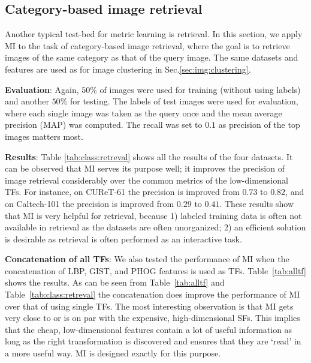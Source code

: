 \documentclass[10pt,twocolumn,letterpaper]{article}
\begin{document}

\subsection{Category-based image retrieval}

Another typical test-bed for metric learning is retrieval. In this
section, we apply MI to the task of category-based image retrieval,
where the goal is to retrieve images of the same category as that 
of the query image. The same datasets and features are used as for
image clustering in Sec.\ref{sec:img:clustering}.

\textbf{Evaluation}: Again, $50\%$ of images were used for training
(without using labels) and another $50\%$ for testing. The labels of
test images were used for evaluation, where each single image was
taken as the query once and the mean average precision (MAP) was
computed. The recall was set to $0.1$ as precision of the top images
matters most.


\textbf{Results}: Table \ref{tab:class:retreval} shows all the results
of the four datasets. It can be observed that MI
serves its purpose well; it improves the precision of image retrieval
considerably over the common metrics of the low-dimensional TFs. 
For instance, on CUReT-61 the precision is improved from
$0.73$ to $0.82$, and on Caltech-101 the precision is improved from
$0.29$ to $0.41$.  These results show that MI is very helpful for
retrieval, because 1) labeled training data is often not available in
retrieval as the datasets are often unorganized; 2) an efficient
solution is desirable as retrieval is often performed as an interactive
task.

\textbf{Concatenation of all TFs}: We also tested the performance of
MI when the concatenation of LBP, GIST, and PHOG features is used as 
TFs. Table~\ref{tab:alltf} shows the results. As can be seen from
Table~\ref{tab:alltf} and Table~\ref{tab:class:retreval} the 
concatenation does improve the performance of MI over that of using 
single TFs. The most interesting observation is that MI gets very close
to or is on par with the expensive, high-dimensional SFs. This implies
that the cheap, low-dimensional features contain a lot of useful
information as long as the right transformation is discovered and
ensures that they are `read' in a more useful way. MI is designed 
exactly for this purpose. 
\end{document}
